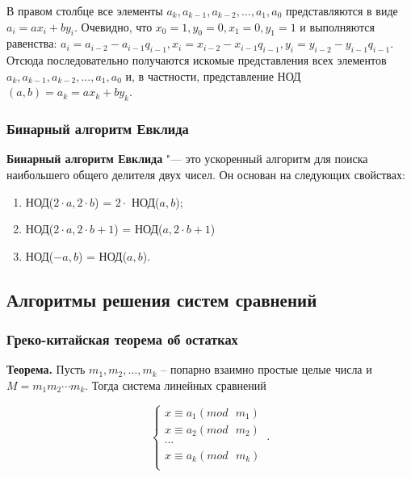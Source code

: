 \documentclass[bachelor, och, labwork]{SCWorks}
\begin{document}
        В правом столбце все элементы $a_k, a_{k-1}, a_{k-2}, . . . , a_1, a_0$
        представляются в виде $a_i = ax_i + by_i$. Очевидно, что $x_0 = 1, y_0 =
        0, x_1 = 0, y_1 = 1$ и выполняются равенства: $a_i = a_{i-2} - a_{i-1}
        q_{i-1}, x_i = x_{i-2} - x_{i-1} q_{i-1}, y_i = y_{i-2} - y_{i-1}
        q_{i-1}$. Отсюда последовательно получаются искомые представления всех
        элементов $a_k, a_{k-1}, a_{k-2}, \dots, a_1, a_0$ и, в частности,
        представление НОД$(a,b) = a_k = ax_k +by_k$.

    \subsubsection{Бинарный алгоритм Евклида}

        \textbf{Бинарный алгоритм Евклида} "--- это ускоренный алгоритм для поиска
        наибольшего общего делителя двух чисел. Он основан на
        следующих свойствах:

        \begin{enumerate}
            \item НОД($2 \cdot a, 2 \cdot b$) = $2 \cdot$ НОД($a, b$);
            \item НОД($2 \cdot a, 2 \cdot b + 1$) = НОД($a, 2 \cdot b + 1$)
            \item НОД($-a, b$) = НОД($a, b$).
        \end{enumerate}

    \subsection{Алгоритмы решения систем сравнений}
    \subsubsection{Греко-китайская теорема об остатках}

        \textbf{Теорема.} Пусть $m_1, m_2, \dots , m_k$ – попарно взаимно
        простые целые числа и $M = m_1m_2 \cdots m_k$. Тогда система линейных
        сравнений


        \begin{equation}
            \begin{cases}
                x \equiv a_1 (mod \text{ } m_1)\\
                x \equiv a_2 (mod \text{ } m_2)\\
                \cdots\\
                x \equiv a_k (mod \text{ } m_k)\\              
            \end{cases}\,.
        \end{equation}
        
\end{document}
